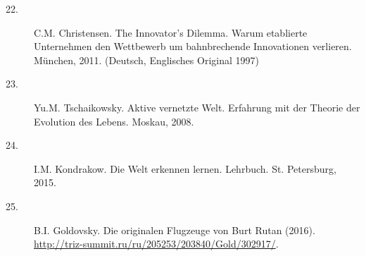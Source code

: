 \documentclass[11pt,a4paper]{article}
\begin{document}
\begin{description}
\item[22.] C.M. Christensen. The Innovator's Dilemma. Warum etablierte
  Unternehmen den Wettbewerb um bahnbrechende Innovationen verlieren. München,
  2011.  (Deutsch, Englisches Original 1997)
\item[23.] Yu.M. Tschaikowsky. Aktive vernetzte Welt. Erfahrung mit der
  Theorie der Evolution des Lebens. Moskau, 2008.
\item[24.] I.M. Kondrakow. Die Welt erkennen lernen. Lehrbuch. St. Petersburg,
  2015.
\item[25.] B.I. Goldovsky. Die originalen Flugzeuge von Burt Rutan (2016).\\
  \url{http://triz-summit.ru/ru/205253/203840/Gold/302917/}. 
\end{description}
\end{document}
